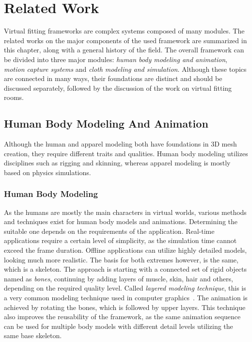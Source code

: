 \chapter{Related Work}
\label{chapter_related_work}

Virtual fitting frameworks are complex systems composed of many modules. The related works on the major components of the used framework are summarized in this chapter, along with a general history of the field. 
The overall framework can be divided into three major modules: \textit{human body modeling and animation}, \textit{motion capture systems} and \textit{cloth modeling and simulation}. Although these topics are connected in many ways, their foundations are distinct and should be discussed separately, followed by the discussion of the work on virtual fitting rooms.

\section{Human Body Modeling And Animation}
\label{section_related_modeling}

Although the human and apparel modeling both have foundations in 3D mesh creation, they require different traits and qualities. Human body modeling utilizes disciplines such as rigging and skinning, whereas apparel modeling is mostly based on physics simulations.

\subsection{Human Body Modeling}
As the humans are mostly the main characters in virtual worlds, various methods and techniques exist for human body models and animations. Determining the suitable one depends on the requirements of the application. Real-time applications require a certain level of simplicity, as the simulation time cannot exceed the frame duration. Offline applications can utilize highly detailed models, looking much more realistic. The basis for both extremes however, is the same, which is a skeleton. The approach is starting with a connected set of rigid objects named as \textit{bones}, continuing by adding layers of muscle, skin, hair and others, depending on the required quality level. Called \textit{layered modeling technique}, this is a very common modeling technique used in computer graphics~\cite{Chadwick1989}. The animation is achieved by rotating the bones, which is followed by upper layers. This technique also improves the reusability of the framework, as the same animation sequence can be used for multiple body models with different detail levels utilizing the same base skeleton.   

